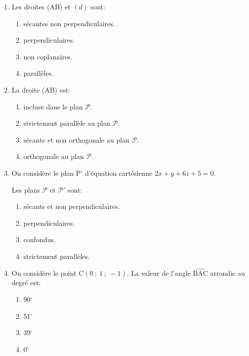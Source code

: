 \medskip
\begin{enumerate}
\item Les droites (AB) et $(d)$ sont:
	\begin{enumerate}
		\item sécantes non perpendiculaires. 
		\item  perpendiculaires.
		\item non coplanaires.
		\item parallèles.
	\end{enumerate}
\item La droite (AB) est:
	\begin{enumerate}
		\item incluse dans le plan $\mathcal{P}$.
		\item strictement parallèle au plan $\mathcal{P}$.
		\item sécante et non orthogonale au plan $\mathcal{P}$.
		\item orthogonale au plan $\mathcal{P}$.
	\end{enumerate}
\item On considère le plan P' d'équation cartésienne $2x+y+6z+5 = 0$. 

Les plans $\mathcal{P}$ et $\mathcal{P}'$ sont:
	\begin{enumerate}
		\item sécants et non perpendiculaires.
		\item perpendiculaires.
		\item confondus.
		\item strictement parallèles.
	\end{enumerate}
\item On considère le point C$(0~;~1~;~-1)$. La valeur de l'angle $\widehat{\text{BAC}}$ arrondie au degré est: 
	\begin{enumerate}
		\item 90\ensuremath{^\circ}
		\item 51\ensuremath{^\circ}
		\item 39\ensuremath{^\circ}
		\item 0\ensuremath{^\circ}
	\end{enumerate}
\end{enumerate}

\bigskip
